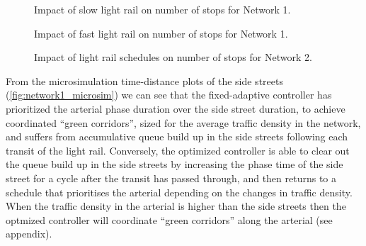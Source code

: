 \begin{figure*}[t!] \centering
%
\vspace{-5mm}
\caption{Impact of slow light rail on number of stops for Network 1.}
%
\label{fig:network1_hist_slow}
\end{figure*}

\begin{figure*}[t!] \centering
%
\vspace{-5mm}
\caption{Impact of fast light rail on number of stops for Network 1.}
%
\label{fig:network1_hist_fast}
\end{figure*}

\begin{figure*}[t!] \centering
%
\vspace{-5mm}
\caption{Impact of light rail schedules on number of stops for Network 2.}
%
\label{fig:network2_hist}
\end{figure*}

From the microsimulation time-distance plots of the side streets (\cref{fig:network1_microsim}) we can see that the fixed-adaptive controller has prioritized the arterial phase duration over the side street duration, to achieve coordinated ``green corridors'', sized for the average traffic density in the network, and suffers from accumulative queue build up in the side streets following each transit of the light rail.
Conversely, the optimized controller is able to clear out the queue build up in the side streets by increasing the phase time of the side street for a cycle after the transit has passed through, and then returns to a schedule that prioritises the arterial depending on the changes in traffic density. When the traffic density in the arterial is higher than the side streets then the optmized controller will coordinate ``green corridors'' along the arterial (see appendix).

